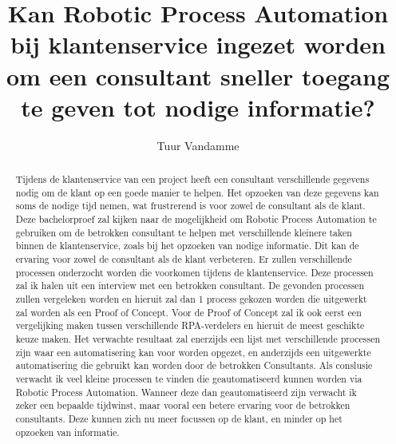 \documentclass{hogent-article}
\title{Kan Robotic Process Automation bij klantenservice ingezet worden om een consultant sneller toegang te geven tot nodige informatie?}
\author{Tuur Vandamme}
\begin{document}
\begin{abstract}
  Tijdens de klantenservice van een project heeft een consultant verschillende gegevens nodig om de klant op een goede manier te helpen. Het opzoeken van deze gegevens kan soms de nodige tijd nemen, wat frustrerend is voor zowel de consultant als de klant. Deze bachelorproef zal kijken naar de mogelijkheid om Robotic Process Automation te gebruiken om de betrokken consultant te helpen met verschillende kleinere taken binnen de klantenservice, zoals bij het opzoeken van nodige informatie. Dit kan de ervaring voor zowel de consultant als de klant verbeteren. Er zullen verschillende processen onderzocht worden die voorkomen tijdens de klantenservice. Deze processen zal ik halen uit een interview met een betrokken consultant. De gevonden processen zullen vergeleken worden en hieruit zal dan 1 process gekozen worden die uitgewerkt zal worden als een Proof of Concept. Voor de Proof of Concept zal ik ook eerst een vergelijking maken tussen verschillende RPA-verdelers en hieruit de meest geschikte keuze maken. Het verwachte resultaat zal enerzijds een lijst met verschillende processen zijn waar een automatisering kan voor worden opgezet, en anderzijds een uitgewerkte automatisering die gebruikt kan worden door de betrokken Consultants. Als conslusie verwacht ik veel kleine processen te vinden die geautomatiseerd kunnen worden via Robotic Process Automation. Wanneer deze dan geautomatiseerd zijn verwacht ik zeker een bepaalde tijdwinst, maar vooral een betere ervaring voor de betrokken consultants. Deze kunnen zich nu meer focussen op de klant, en minder op het opzoeken van informatie.
\end{abstract}

\tableofcontents



\printbibliography[heading=bibintoc]
\end{document}
